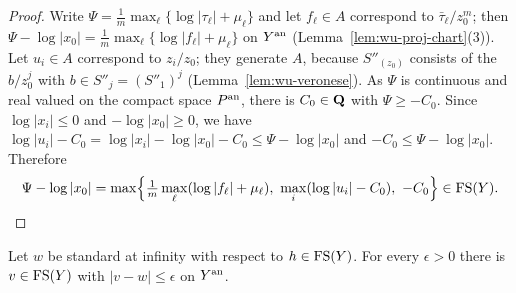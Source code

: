 \begin{proof}
Write $\Psi=\frac1m\max_\ell\{\log|\tau_\ell|+\mu_\ell\}$ and let $f_\ell\in A$ correspond to $\bar\tau_\ell/z_0^m$; then
$\Psi-\log|x_0|=\frac1m\max_\ell\{\log|f_\ell|+\mu_\ell\}$ on $Y^{\mathrm{an}}$ (Lemma~\ref{lem:wu-proj-chart}(3)). Let $u_i\in A$
correspond to $z_i/z_0$; they generate $A$, because $S''_{(z_0)}$ consists of the $b/z_0^j$ with $b\in S''_j=(S''_1)^j$
(Lemma~\ref{lem:wu-veronese}). As $\Psi$ is continuous and real valued on the compact space $P^{\mathrm{an}}$, there is $C_0\in\mathbf{Q}$
with $\Psi\ge-C_0$. Since $\log|x_i|\le0$ and $-\log|x_0|\ge0$, we have
$\log|u_i|-C_0=\log|x_i|-\log|x_0|-C_0\le\Psi-\log|x_0|$ and $-C_0\le\Psi-\log|x_0|$. Therefore
\[
\Psi-\log|x_0|=\max\Bigl\{\tfrac1m\max_\ell(\log|f_\ell|+\mu_\ell),\ \max_i(\log|u_i|-C_0),\ -C_0\Bigr\}\in\FS(Y).
\]
\end{proof}

\begin{theorem}\label{thm:wu-pl-approx-uniform}
\leanok
{}
Let $w$ be standard at infinity with respect to $h\in\mathrm{FS}(Y)$. For every $\epsilon>0$ there is $v\in\mathrm{FS}(Y)$ with
$|v-w|\le\epsilon$ on $Y^{\mathrm{an}}$.
\end{theorem}

